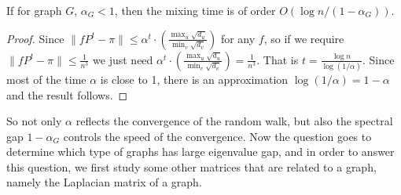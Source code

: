 \begin{corollary}
If for graph $G$, $\alpha_G < 1$, then the mixing time is of order
$O(\log n/(1-\alpha_G))$.
\end{corollary}

\begin{proof}
Since $\parallel fP^t-\pi \parallel \leq \alpha^t
\cdot(\frac{\max_u\sqrt{d_u}}{\min_v{\sqrt{d_v}}})$ for any $f$, so
if we require $\parallel fP^t-\pi \parallel \leq \frac{1}{n^3}$ we
just need $\alpha^t
\cdot(\frac{\max_u\sqrt{d_u}}{\min_v{\sqrt{d_v}}}) = \frac{1}{n^3}$.
That is $t=\frac{\log n} {\log (1/\alpha)}$. Since most of the time
$\alpha$ is close to 1, there is an approximation $\log (1/\alpha) =
1-\alpha$ and the result follows.
\end{proof}

So not only $\alpha$ reflects the convergence of the random walk,
but also the spectral gap $1-\alpha_G$ controls the speed of the
convergence. Now the question goes to determine which type of graphs
has large eigenvalue gap, and in order to answer this question, we
first study some other matrices that are related to a graph, namely
the Laplacian matrix of a graph.
